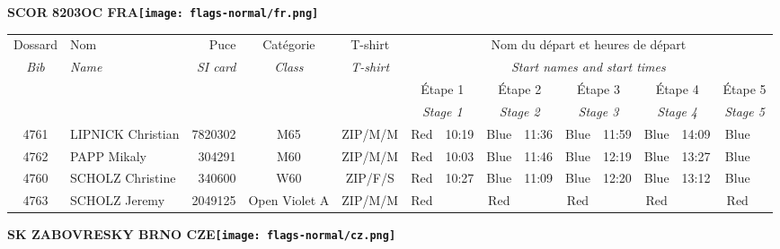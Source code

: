 \documentclass{report}
\begin{document}
\newpage
  \Huge \centering \bfseries SCOR 8203OC FRA\normalfont \footnotesize \sffamily \hfill \texttt{[image: flags-normal/fr.png]} \newline 
  \begin{longtable}{|c|l|r|c|c|*{5}{cc|}}
    Dossard & Nom  & Puce    & Catégorie & T-shirt & \multicolumn{10}{c|}{Nom du départ et heures de départ} \\
    \itshape Bib     & \itshape Name & \itshape SI card & \itshape Class  & \itshape  T-shirt  & \multicolumn{10}{c|}{\itshape Start names and start times} \\
    \hline
    & & & & & \multicolumn{2}{c|}{Étape 1} & \multicolumn{2}{c|}{Étape 2} & \multicolumn{2}{c|}{Étape 3} & \multicolumn{2}{c|}{Étape 4} & \multicolumn{2}{c|}{Étape 5} \\
    & & & & & \multicolumn{2}{c|}{\itshape Stage 1} & \multicolumn{2}{c|}{\itshape Stage 2} & \multicolumn{2}{c|}{\itshape Stage 3} & \multicolumn{2}{c|}{\itshape Stage 4} & \multicolumn{2}{c|}{\itshape Stage 5} \\
    \hline
    4761 & LIPNICK Christian & 7820302 & M65 & ZIP/M/M & Red & 10:19 & Blue & 11:36 & Blue & 11:59 & Blue & 14:09 & Blue &  \\
    4762 & PAPP Mikaly & 304291 & M60 & ZIP/M/M & Red & 10:03 & Blue & 11:46 & Blue & 12:19 & Blue & 13:27 & Blue &  \\
    4760 & SCHOLZ Christine & 340600 & W60 & ZIP/F/S & Red & 10:27 & Blue & 11:09 & Blue & 12:20 & Blue & 13:12 & Blue &  \\
    4763 & SCHOLZ Jeremy & 2049125 & Open Violet A & ZIP/M/M & Red &   & Red &   & Red &   & Red &   & Red &  \\
  \end{longtable}
\newpage
  \Huge \centering \bfseries SK ZABOVRESKY BRNO  CZE\normalfont \footnotesize \sffamily \hfill \texttt{[image: flags-normal/cz.png]} \newline 
\end{document}

